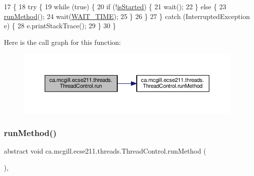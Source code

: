 \begin{DoxyCode}
17                                  \{
18     \textcolor{keywordflow}{try} \{
19       \textcolor{keywordflow}{while} (\textcolor{keyword}{true}) \{
20         \textcolor{keywordflow}{if} (!\hyperlink{classca_1_1mcgill_1_1ecse211_1_1threads_1_1_thread_control_a92f4933511db42476e39956246bcf2fe}{isStarted}) \{
21           wait();
22         \} \textcolor{keywordflow}{else} \{
23           \hyperlink{classca_1_1mcgill_1_1ecse211_1_1threads_1_1_thread_control_a2959c54bdb6c62c9d5569cdf3ccf2418}{runMethod}();
24           wait(\hyperlink{classca_1_1mcgill_1_1ecse211_1_1threads_1_1_thread_control_a395cfe1d73b3ef14da0830ed0a499f82}{WAIT\_TIME});
25         \}
26       \}
27     \} \textcolor{keywordflow}{catch} (InterruptedException e) \{
28       e.printStackTrace();
29     \}
30   \}
\end{DoxyCode}
Here is the call graph for this function\+:
\nopagebreak
\begin{figure}[H]
\begin{center}
\leavevmode
\includegraphics[width=350pt]{classca_1_1mcgill_1_1ecse211_1_1threads_1_1_thread_control_a03e743000ea2c37080427565e8ec5f35_cgraph}
\end{center}
\end{figure}
\mbox{\label{classca_1_1mcgill_1_1ecse211_1_1threads_1_1_thread_control_a2959c54bdb6c62c9d5569cdf3ccf2418}} 
\subsubsection{\texorpdfstring{run\+Method()}{runMethod()}}
{\footnotesize\ttfamily abstract void ca.\+mcgill.\+ecse211.\+threads.\+Thread\+Control.\+run\+Method (\begin{DoxyParamCaption}{ }\end{DoxyParamCaption})\hspace{0.3cm}{\ttfamily [abstract]}, {\ttfamily [protected]}}

